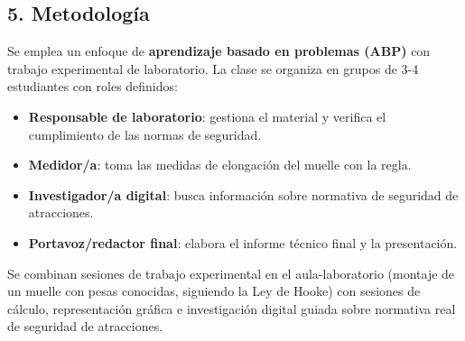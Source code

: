 \documentclass[11pt,a4paper]{article}
\begin{document}
\subsection*{5. Metodología}
Se emplea un enfoque de \textbf{aprendizaje basado en problemas (ABP)} con trabajo experimental de laboratorio. La clase se organiza en grupos de 3-4 estudiantes con roles definidos:
\begin{itemize}
    \item \textbf{Responsable de laboratorio}: gestiona el material y verifica el cumplimiento de las normas de seguridad.
    \item \textbf{Medidor/a}: toma las medidas de elongación del muelle con la regla.
    \item \textbf{Investigador/a digital}: busca información sobre normativa de seguridad de atracciones.
    \item \textbf{Portavoz/redactor final}: elabora el informe técnico final y la presentación.
\end{itemize}
Se combinan sesiones de trabajo experimental en el aula-laboratorio (montaje de un muelle con pesas conocidas, siguiendo la Ley de Hooke) con sesiones de cálculo, representación gráfica e investigación digital guiada sobre normativa real de seguridad de atracciones.
\end{document}
